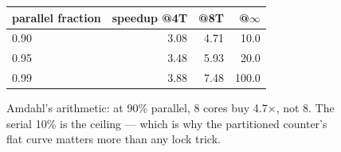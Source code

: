 \begin{figure}[htbp]
\centering
\begin{tabular}{lrrr}
\toprule
parallel fraction & speedup @4T & @8T & @$\infty$ \\
\midrule
0.90 & 3.08 & 4.71 & 10.0 \\
0.95 & 3.48 & 5.93 & 20.0 \\
0.99 & 3.88 & 7.48 & 100.0 \\
\bottomrule
\end{tabular}
\caption{Amdahl's arithmetic: at 90\% parallel, 8 cores buy 4.7$\times$,
not 8. The serial 10\% is the ceiling --- which is why the
partitioned counter's flat curve matters more than any lock trick.}
\label{fig:amdahl13}
\end{figure}
